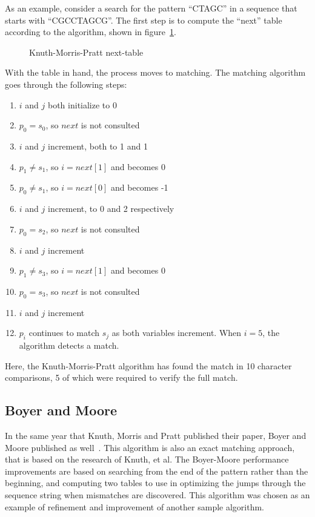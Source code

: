 As an example, consider a search for the pattern ``CTAGC'' in a sequence that starts with ``CGCCTAGCG''. The first step is to compute the ``next'' table according to the algorithm, shown in figure~\ref{fig:kmp_next}.

\begin{figure}[ht]
\centering

\caption{Knuth-Morris-Pratt next-table}
\label{fig:kmp_next}
\end{figure}

With the table in hand, the process moves to matching. The matching algorithm goes through the following steps:

\begin{enumerate}
\item $i$ and $j$ both initialize to 0
\item $p_0 = s_0$, so $next$ is not consulted
\item $i$ and $j$ increment, both to 1 and 1
\item $p_1 \neq s_1$, so $i = next[1]$ and becomes 0
\item $p_0 \neq s_1$, so $i = next[0]$ and becomes -1
\item $i$ and $j$ increment, to 0 and 2 respectively
\item $p_0 = s_2$, so $next$ is not consulted
\item $i$ and $j$ increment
\item $p_1 \neq s_3$, so $i = next[1]$ and becomes 0
\item $p_0 = s_3$, so $next$ is not consulted
\item $i$ and $j$ increment
\item $p_i$ continues to match $s_j$ as both variables increment. When $i = 5$, the algorithm detects a match.
\end{enumerate}

Here, the Knuth-Morris-Pratt algorithm has found the match in 10 character comparisons, 5 of which were required to verify the full match.

\subsection{Boyer and Moore}

In the same year that Knuth, Morris and Pratt published their paper, Boyer and Moore published as well~\cite{boyer.moore.1977}. This algorithm is also an exact matching approach, that is based on the research of Knuth, et al. The Boyer-Moore performance improvements are based on searching from the end of the pattern rather than the beginning, and computing two tables to use in optimizing the jumps through the sequence string when mismatches are discovered. This algorithm was chosen as an example of refinement and improvement of another sample algorithm.

